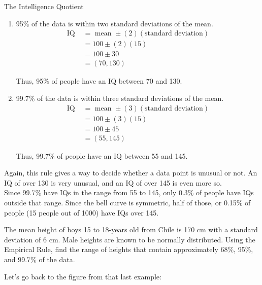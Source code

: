 \begin{example}[https://www.youtube.com/watch?v=cTRr0B5Cp8k&list=PLfmpjsIzhzttL_Uec2nCbDRcAcUF7NKG8&index=24]{The Intelligence Quotient}
\begin{enumerate}
\item 95\% of the data is within two standard deviations of the mean.
\begin{align*}
\textrm{IQ } &= \textrm{ mean } \pm (2)(\textrm{standard deviation})\\
&= 100 \pm (2)(15)\\
&= 100 \pm 30\\
&= \boxed{(70,130)}
\end{align*}

Thus, 95\% of people have an IQ between 70 and 130.

\item 99.7\% of the data is within three standard deviations of the mean.
\begin{align*}
\textrm{IQ } &= \textrm{ mean } \pm (3)(\textrm{standard deviation})\\
&= 100 \pm (3)(15)\\
&= 100 \pm 45\\
&= \boxed{(55,145)}
\end{align*}

Thus, 99.7\% of people have an IQ between 55 and 145.
\end{enumerate}

Again, this rule gives a way to decide whether a data point is unusual or not.  An IQ of over 130 is very unusual, and an IQ of over 145 is even more so.\\

Since 99.7\% have IQs in the range from 55 to 145, only 0.3\% of people have IQs outside that range.  Since the bell curve is symmetric, half of those, or 0.15\% of people (15 people out of 1000) have IQs over 145.
\end{example}

\begin{try}
The mean height of boys 15 to 18-years old from Chile is 170 cm with a standard deviation of 6 cm. Male heights are known to be normally distributed. Using the Empirical Rule, find the range of heights that contain approximately 68\%, 95\%, and 99.7\% of the data.
\end{try}
\pagebreak
\text{}
\vfill

Let's go back to the figure from that last example:\\
\vfill

